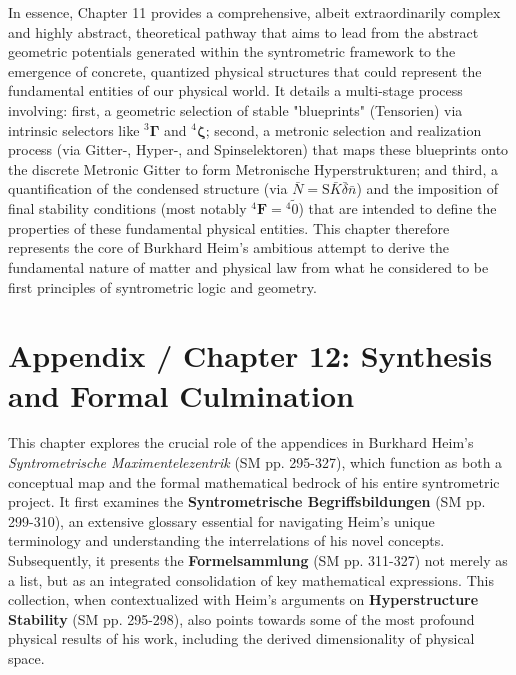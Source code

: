 \documentclass[12pt]{article}
\newcommand{\fundamentalkondensor}{{}^3\bm{\Gamma}}
\newcommand{\strukturkompressor}{{}^4\bm{\zeta}}
\newcommand{\metronisiertekondensor}[1]{{}^{#1}\mathbf{F}} %
\begin{document}
In essence, Chapter 11 provides a comprehensive, albeit extraordinarily complex and highly abstract, theoretical pathway that aims to lead from the abstract geometric potentials generated within the syntrometric framework to the emergence of concrete, quantized physical structures that could represent the fundamental entities of our physical world. It details a multi-stage process involving: first, a geometric selection of stable "blueprints" (Tensorien) via intrinsic selectors like \( \fundamentalkondensor \) and \( \strukturkompressor \); second, a metronic selection and realization process (via Gitter-, Hyper-, and Spinselektoren) that maps these blueprints onto the discrete Metronic Gitter to form Metronische Hyperstrukturen; and third, a quantification of the condensed structure (via \(\bar{N} = \mathrm{S}\bar{K}\bar{\delta}\bar{n}\)) and the imposition of final stability conditions (most notably \( \metronisiertekondensor{4}={}^{4}\tilde{0} \)) that are intended to define the properties of these fundamental physical entities. This chapter therefore represents the core of Burkhard Heim's ambitious attempt to derive the fundamental nature of matter and physical law from what he considered to be first principles of syntrometric logic and geometry.

\clearpage 

\section{Appendix / Chapter 12: Synthesis and Formal Culmination}
\label{sec:appendix}

This chapter explores the crucial role of the appendices in Burkhard Heim's \textit{Syntrometrische Maximentelezentrik} (SM pp. 295-327), which function as both a conceptual map and the formal mathematical bedrock of his entire syntrometric project. It first examines the \textbf{Syntrometrische Begriffsbildungen} (SM pp. 299-310), an extensive glossary essential for navigating Heim's unique terminology and understanding the interrelations of his novel concepts. Subsequently, it presents the \textbf{Formelsammlung} (SM pp. 311-327) not merely as a list, but as an integrated consolidation of key mathematical expressions. This collection, when contextualized with Heim's arguments on \textbf{Hyperstructure Stability} (SM pp. 295-298), also points towards some of the most profound physical results of his work, including the derived dimensionality of physical space.
\end{document}
